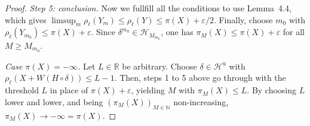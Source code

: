 \documentclass[11pt,a4paper]{report}
\numberwithin{equation}{chapter}
\theoremstyle{plain}
\theoremstyle{definition}
\newcommand{\R}{\mathbb{R}}
\newcommand{\N}{\mathbb{N}}
\newcommand{\HH}{\mathcal{H}}
\newcommand{\Hu}{\mathcal{H}^{\mathrm{u}}}
\begin{document}
\begin{proof}
  \textit{Step 5: conclusion.}
  Now we fullfill all the conditions to use Lemma~4.4, which gives $\limsup_m\rho_\ell(Y_m)\le\rho_\ell(Y)\le\pi(X)+\varepsilon/2$.
  Finally, choose $m_0$ with $\rho_\ell(Y_{m_0})\le\pi(X)+\varepsilon$. Since
  $\delta^{m_0}\in\HH_{M_{m_0}}$, one has $\pi_M(X)\le\pi(X)+\varepsilon$
  for all $M\ge M_{m_0}$.

  \textit{Case $\pi(X)=-\infty$.}
  Let $L\in\R$ be arbitrary. Choose $\delta\in\Hu$ with
  $\rho_\ell(X+W(H\circ\delta))\le L-1$. Then, steps 1 to 5 above go through
  with the threshold $L$ in place of $\pi(X)+\varepsilon$, yielding $M$ with
  $\pi_M(X)\le L$. By choosing $L$ lower and lower, and being
  $(\pi_M(X))_{M\in\N}$ non-increasing, $\pi_M(X)\to-\infty=\pi(X)$.
\end{proof}
\end{document}
